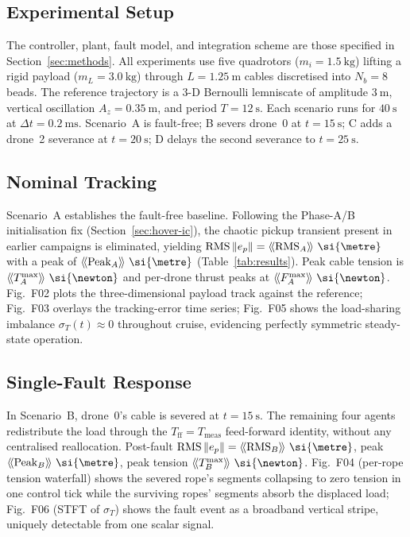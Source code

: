 \subsection{Experimental Setup}
\label{sec:results:setup}
The controller, plant, fault model, and integration scheme are those
specified in Section~\ref{sec:methods}. All experiments use five
quadrotors ($m_i=\SI{1.5}{\kilo\gram}$) lifting a rigid payload
($m_L=\SI{3.0}{\kilo\gram}$) through $L=\SI{1.25}{\metre}$ cables
discretised into $N_b=8$ beads. The reference trajectory is a 3-D
Bernoulli lemniscate of amplitude $\SI{3}{\metre}$, vertical
oscillation $A_z=\SI{0.35}{\metre}$, and period $T=\SI{12}{\second}$.
Each scenario runs for $\SI{40}{\second}$ at
$\Delta t=\SI{0.2}{\milli\second}$. Scenario~A is fault-free; B severs
drone~0 at $t=\SI{15}{\second}$; C adds a drone~2 severance at
$t=\SI{20}{\second}$; D delays the second severance to
$t=\SI{25}{\second}$.

\subsection{Nominal Tracking}
\label{sec:results:nominal}
Scenario~A establishes the fault-free baseline. Following the Phase-A/B
initialisation fix (Section~\ref{sec:hover-ic}), the chaotic pickup
transient present in earlier campaigns is eliminated, yielding
$\mathrm{RMS}\,\lVert e_p\rVert=\NEWRmsA~\si{\metre}$ with a peak of
$\NEWPeakA~\si{\metre}$ (Table~\ref{tab:results}). Peak cable tension
is $\NEWPeakTA~\si{\newton}$ and per-drone thrust peaks at
$\NEWPeakFA~\si{\newton}$. Fig.~F02 plots the three-dimensional
payload track against the reference; Fig.~F03 overlays the
tracking-error time series; Fig.~F05 shows the load-sharing
imbalance $\sigma_T(t)\approx 0$ throughout cruise, evidencing
perfectly symmetric steady-state operation.

\subsection{Single-Fault Response}
\label{sec:results:single}
In Scenario~B, drone~0's cable is severed at $t=\SI{15}{\second}$. The
remaining four agents redistribute the load through the
$T_{\mathrm{ff}}=T_{\mathrm{meas}}$ feed-forward identity, without any
centralised reallocation. Post-fault
$\mathrm{RMS}\,\lVert e_p\rVert=\NEWRmsB~\si{\metre}$, peak
$\NEWPeakB~\si{\metre}$, peak tension $\NEWPeakTB~\si{\newton}$.
Fig.~F04 (per-rope tension waterfall) shows the severed rope's
segments collapsing to zero tension in one control tick while the
surviving ropes' segments absorb the displaced load;
Fig.~F06 (STFT of $\sigma_T$) shows the fault event as a broadband
vertical stripe, uniquely detectable from one scalar signal.

